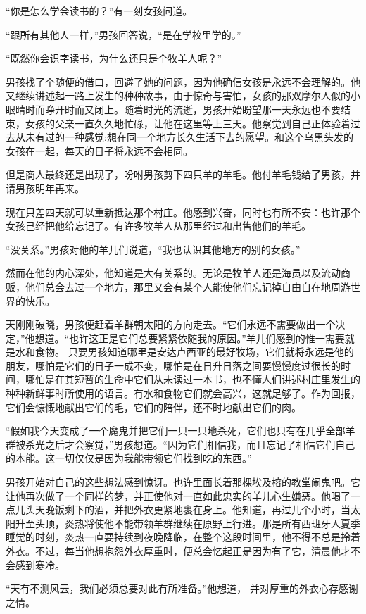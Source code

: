 \documentclass[twoside,openany]{book}
\begin{document}
“你是怎么学会读书的？”有一刻女孩问道。

“跟所有其他人一样，”男孩回答说，“是在学校里学的。”

“既然你会识字读书，为什么还只是个牧羊人呢？”

男孩找了个随便的借口，回避了她的问题，因为他确信女孩是永远不会理解的。他又继续讲述起一路上发生的种种故事，由于惊奇与害怕，女孩的那双摩尔人似的小眼晴时而睁开时而又闭上。随着时光的流逝，男孩开始盼望那一天永远也不要结束，女孩的父亲一直久久地忙碌，让他在这里等上三天。他察觉到自己正体验着过去从未有过的一种感觉:想在同一个地方长久生活下去的愿望。和这个乌黑头发的女孩在一起，每天的日子将永远不会相同。

但是商人最终还是出现了，吩咐男孩剪下四只羊的羊毛。他付羊毛钱给了男孩，并请男孩明年再来。

现在只差四天就可以重新抵达那个村庄。他感到兴奋，同时也有所不安：也许那个女孩己经把他给忘记了。有许多牧羊人从那里经过和出售他们的羊毛。

“没关系。”男孩对他的羊儿们说道，“我也认识其他地方的别的女孩。”

然而在他的内心深处，他知道是大有关系的。无论是牧羊人还是海员以及流动商贩，他们总会去过一个地方，那里又会有某个人能使他们忘记掉自由自在地周游世界的快乐。

天刚刚破晓，男孩便赶着羊群朝太阳的方向走去。“它们永远不需要做出一个决定，”他想道。“也许这正是它们总要紧紧依随我的原因。”羊儿们感到的惟一需要就是水和食物。 只要男孩知道哪里是安达卢西亚的最好牧场，它们就将永远是他的朋友，哪怕是它们的日子一成不变，哪怕是在日升日落之间耍慢慢度过很长的时间，哪怕是在其短暂的生命中它们从未读过一本书，也不懂人们讲述村庄里发生的种种新鲜事时所使用的语言。有水和食物它们就会高兴，这就足够了。作为回报，它们会慷慨地献出它们的毛，它们的陪伴，还不时地献出它们的肉。

“假如我今天变成了一个魔鬼并把它们一只一只地杀死，它们也只有在几乎全部羊群被杀光之后才会察觉，”男孩想道。“因为它们相信我，而且忘记了相信它们自己的本能。这一切仅仅是因为我能带领它们找到吃的东西。”

男孩开始对自己的这些想法感到惊讶。也许里面长着那棵埃及榕的教堂闹鬼吧。它让他再次做了一个同样的梦，并正使他对一直如此忠实的羊儿心生嫌恶。他喝了一点儿头天晚饭剩下的酒，并把外衣更紧地裹在身上。他知道，再过儿个小时，当太阳升至头顶，炎热将使他不能带领羊群继续在原野上行进。那是所有西班牙人夏季睡觉的时刻，炎热一直要持续到夜晚降临，在整个这段时间里，他不得不总是拎着外衣。不过，每当他想抱怨外衣厚重时，便总会忆起正是因为有了它，清晨他才不会感到寒冷。

“天有不测风云，我们必须总要对此有所准备。”他想道， 并对厚重的外衣心存感谢之情。
\end{document}
